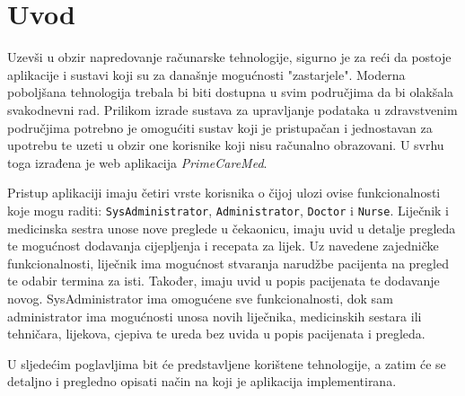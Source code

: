 \section{Uvod}

Uzevši u obzir napredovanje računarske tehnologije, sigurno je za reći da postoje aplikacije i sustavi koji su za današnje mogućnosti "zastarjele". Moderna poboljšana tehnologija trebala bi biti dostupna u svim područjima da bi olakšala svakodnevni rad. Prilikom izrade sustava za upravljanje podataka u zdravstvenim područjima potrebno je omogućiti sustav koji je pristupačan i jednostavan za upotrebu te uzeti u obzir one korisnike koji nisu računalno obrazovani. U svrhu toga izrađena je web aplikacija \textit{PrimeCareMed}. 

Pristup aplikaciji imaju četiri vrste korisnika o čijoj ulozi ovise funkcionalnosti koje mogu raditi: \texttt{SysAdministrator}, \texttt{Administrator}, \texttt{Doctor} i \texttt{Nurse}. Liječnik i medicinska sestra unose nove preglede u čekaonicu, imaju uvid u detalje pregleda te mogućnost dodavanja cijepljenja i recepata za lijek. Uz navedene zajedničke funkcionalnosti, liječnik ima mogućnost stvaranja narudžbe pacijenta na pregled te odabir termina za isti. Također, imaju uvid u popis pacijenata te dodavanje novog. SysAdministrator ima omogućene sve funkcionalnosti, dok sam administrator ima mogućnosti unosa novih liječnika, medicinskih sestara ili tehničara, lijekova, cjepiva te ureda bez uvida u popis pacijenata i pregleda.

U sljedećim poglavljima bit će predstavljene korištene tehnologije, a zatim će se detaljno i pregledno opisati način na koji je aplikacija implementirana.
